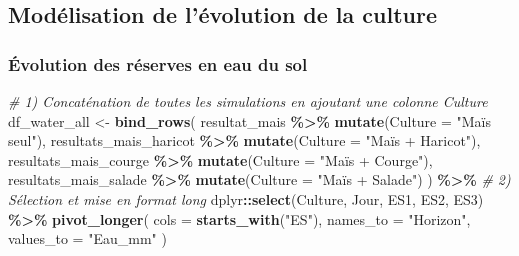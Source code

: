 \documentclass[
]{article}
\newenvironment{Shaded}{\begin{snugshade}}{\end{snugshade}}
\newcommand{\AttributeTok}[1]{\textcolor[rgb]{0.13,0.29,0.53}{#1}}
\newcommand{\CommentTok}[1]{\textcolor[rgb]{0.56,0.35,0.01}{\textit{#1}}}
\newcommand{\FunctionTok}[1]{\textcolor[rgb]{0.13,0.29,0.53}{\textbf{#1}}}
\newcommand{\NormalTok}[1]{#1}
\newcommand{\OtherTok}[1]{\textcolor[rgb]{0.56,0.35,0.01}{#1}}
\newcommand{\SpecialCharTok}[1]{\textcolor[rgb]{0.81,0.36,0.00}{\textbf{#1}}}
\newcommand{\StringTok}[1]{\textcolor[rgb]{0.31,0.60,0.02}{#1}}
\begin{document}
\subsection{Modélisation de l'évolution de la
culture}\label{moduxe9lisation-de-luxe9volution-de-la-culture}

\subsubsection{Évolution des réserves en eau du
sol}\label{uxe9volution-des-ruxe9serves-en-eau-du-sol}

\begin{Shaded}
\begin{Highlighting}[]
\CommentTok{\# 1) Concaténation de toutes les simulations en ajoutant une colonne Culture}
\NormalTok{df\_water\_all }\OtherTok{\textless{}{-}} \FunctionTok{bind\_rows}\NormalTok{(}
\NormalTok{  resultat\_mais               }\SpecialCharTok{\%\textgreater{}\%} \FunctionTok{mutate}\NormalTok{(}\AttributeTok{Culture =} \StringTok{"Maïs seul"}\NormalTok{),}
\NormalTok{  resultats\_mais\_haricot      }\SpecialCharTok{\%\textgreater{}\%} \FunctionTok{mutate}\NormalTok{(}\AttributeTok{Culture =} \StringTok{"Maïs + Haricot"}\NormalTok{),}
\NormalTok{  resultats\_mais\_courge       }\SpecialCharTok{\%\textgreater{}\%} \FunctionTok{mutate}\NormalTok{(}\AttributeTok{Culture =} \StringTok{"Maïs + Courge"}\NormalTok{),}
\NormalTok{  resultats\_mais\_salade       }\SpecialCharTok{\%\textgreater{}\%} \FunctionTok{mutate}\NormalTok{(}\AttributeTok{Culture =} \StringTok{"Maïs + Salade"}\NormalTok{)}
\NormalTok{) }\SpecialCharTok{\%\textgreater{}\%}
  \CommentTok{\# 2) Sélection et mise en format long}
\NormalTok{  dplyr}\SpecialCharTok{::}\FunctionTok{select}\NormalTok{(Culture, Jour, ES1, ES2, ES3) }\SpecialCharTok{\%\textgreater{}\%}
  \FunctionTok{pivot\_longer}\NormalTok{(}
    \AttributeTok{cols      =} \FunctionTok{starts\_with}\NormalTok{(}\StringTok{"ES"}\NormalTok{),}
    \AttributeTok{names\_to  =} \StringTok{"Horizon"}\NormalTok{,}
    \AttributeTok{values\_to =} \StringTok{"Eau\_mm"}
\NormalTok{  )}


\end{Highlighting}
\end{Shaded}
\end{document}
